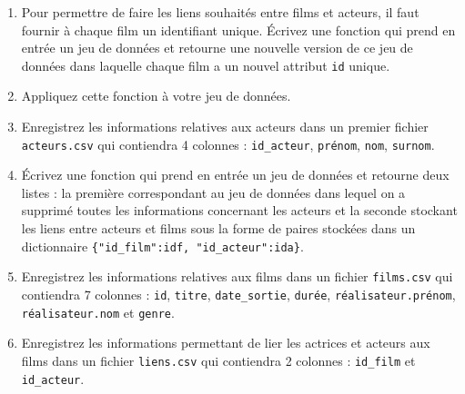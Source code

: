 \documentclass[11pt,a4paper]{article}
\begin{document}
\begin{enumerate}
    \item Pour permettre de faire les liens souhaités entre films et acteurs, il faut fournir à chaque film un identifiant unique. Écrivez une fonction qui prend en entrée un jeu de données et retourne une nouvelle version de ce jeu de données dans laquelle chaque film a un nouvel attribut \verb+id+ unique.
    
    \item Appliquez cette fonction à votre jeu de données.
    
    \item Enregistrez les informations relatives aux acteurs dans un premier fichier \verb+acteurs.csv+ qui contiendra 4 colonnes : \verb+id_acteur+, \verb+prénom+, \verb+nom+, \verb+surnom+.
    
    \item Écrivez une fonction qui prend en entrée un jeu de données et retourne deux listes : la première correspondant au jeu de données dans lequel on a supprimé toutes les informations concernant les acteurs et la seconde stockant les liens entre acteurs et films sous la forme de paires stockées dans un dictionnaire \verb+{"id_film":idf, "id_acteur":ida}+.
    
    \item Enregistrez les informations relatives aux films dans un fichier \verb+films.csv+ qui contiendra 7 colonnes : \verb+id+, \verb+titre+, \verb+date_sortie+, \verb+durée+, \verb+réalisateur.prénom+, \verb+réalisateur.nom+ et \verb+genre+.
    
    \item Enregistrez les informations permettant de lier les actrices et acteurs aux films dans un fichier \verb+liens.csv+ qui contiendra 2 colonnes : \verb+id_film+ et \verb+id_acteur+.
\end{enumerate}
\end{document}
